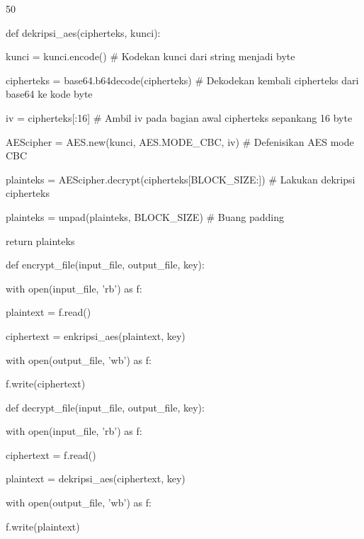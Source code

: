 \documentclass{article}
\begin{document}

50

def dekripsi\_aes(cipherteks, kunci):

    kunci = kunci.encode()                     \# Kodekan kunci dari string menjadi byte

    cipherteks = base64.b64decode(cipherteks)  \# Dekodekan kembali cipherteks dari base64 ke kode byte

    iv = cipherteks[:16]                      \# Ambil iv pada bagian awal cipherteks sepankang 16 byte

    AEScipher = AES.new(kunci, AES.MODE\_CBC, iv)        \# Defenisikan AES mode CBC 

    plainteks = AEScipher.decrypt(cipherteks[BLOCK\_SIZE:])           \# Lakukan dekripsi cipherteks

    plainteks = unpad(plainteks, BLOCK\_SIZE)            \# Buang padding

    return plainteks  

def encrypt\_file(input\_file, output\_file, key):

    with open(input\_file, 'rb') as f:

         plaintext = f.read()

    ciphertext = enkripsi\_aes(plaintext, key)

    with open(output\_file, 'wb') as f:

         f.write(ciphertext)

def decrypt\_file(input\_file, output\_file, key):

    with open(input\_file, 'rb') as f:

         ciphertext = f.read()

    plaintext = dekripsi\_aes(ciphertext, key)

    with open(output\_file, 'wb') as f:

        f.write(plaintext)
\end{document}

